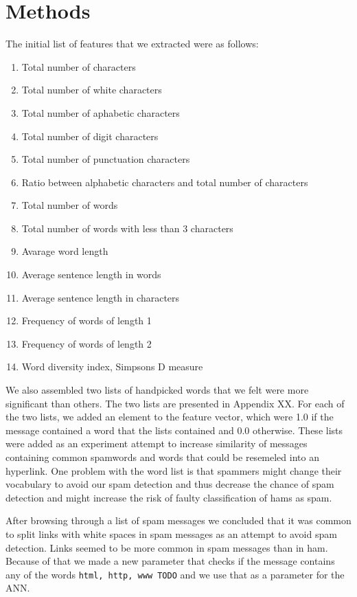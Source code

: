 
\section{Methods}

  The initial list of features that we extracted were as follows:
  \begin{enumerate}
    \item Total number of characters
    \item Total number of white characters 
    \item Total number of aphabetic characters
    \item Total number of digit characters
    \item Total number of punctuation characters
    \item Ratio between alphabetic characters and total number of characters
    \item Total number of words
    \item Total number of words with less than 3 characters
    \item Avarage word length 
    \item Average sentence length in words
    \item Average sentence length in characters
    \item Frequency of words of length 1
    \item Frequency of words of length 2
    \item Word diversity index, Simpsons D measure \cite{simpsons-measure}
  \end{enumerate}
  We also assembled two lists of handpicked words that we felt were more
  significant than others. The two lists are presented in Appendix XX. 
  For each of the two lists, we added an element to the feature vector, which
  were 1.0 if the message contained a word that the lists contained and 0.0
  otherwise.   
  These lists were added as an experiment attempt to increase similarity of
  messages containing common spamwords and words that could be resemeled into
  an hyperlink.
  One problem with the word list is that spammers might change their vocabulary
  to avoid our spam detection and thus decrease the chance of spam detection
  and might increase the risk of faulty classification of hams as spam. 

  After browsing through a list of spam messages we concluded that it was
  common to split links with white spaces in spam messages as an attempt to
  avoid spam detection. Links seemed to be more common in spam messages than in
  ham. Because of that we made a new parameter that checks if the message
  contains any of the words \texttt{html, http, www TODO} and we use that as a
  parameter for the ANN. 

